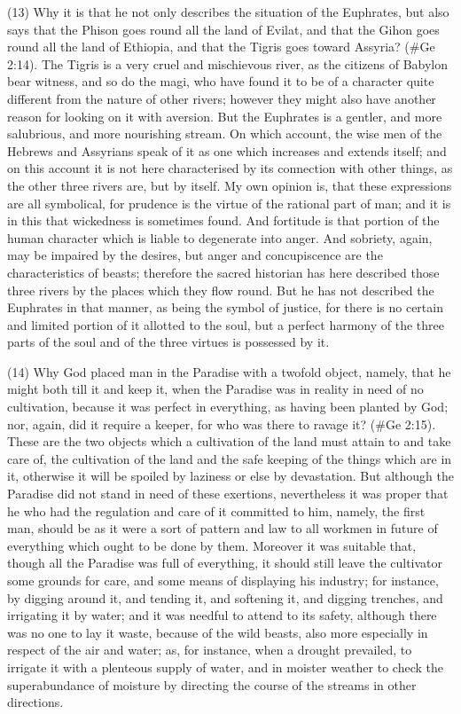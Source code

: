 (13) Why it is that he not only describes the situation of the Euphrates, but also says that the
Phison goes round all the land of Evilat, and that the Gihon goes round all the land of Ethiopia, and
that the Tigris goes toward Assyria? (\#Ge 2:14). The Tigris is a very cruel and mischievous
river, as the citizens of Babylon bear witness, and so do the magi, who have found it to be of a
character quite different from the nature of other rivers; however they might also have another
reason for looking on it with aversion. But the Euphrates is a gentler, and more salubrious, and
more nourishing stream. On which account, the wise men of the Hebrews and Assyrians speak of
it as one which increases and extends itself; and on this account it is not here characterised by its
connection with other things, as the other three rivers are, but by itself. My own opinion is, that
these expressions are all symbolical, for prudence is the virtue of the rational part of man; and it is
in this that wickedness is sometimes found. And fortitude is that portion of the human character
which is liable to degenerate into anger. And sobriety, again, may be impaired by the desires, but
anger and concupiscence are the characteristics of beasts; therefore the sacred historian has
here described those three rivers by the places which they flow round. But he has not described
the Euphrates in that manner, as being the symbol of justice, for there is no certain and limited
portion of it allotted to the soul, but a perfect harmony of the three parts of the soul and of the three
virtues is possessed by it.

(14) Why God placed man in the Paradise with a twofold object, namely, that he might both till it and
keep it, when the Paradise was in reality in need of no cultivation, because it was perfect in
everything, as having been planted by God; nor, again, did it require a keeper, for who was there to
ravage it? (\#Ge 2:15). These are the two objects which a cultivation of the land must attain to
and take care of, the cultivation of the land and the safe keeping of the things which are in it,
otherwise it will be spoiled by laziness or else by devastation. But although the Paradise did not
stand in need of these exertions, nevertheless it was proper that he who had the regulation and
care of it committed to him, namely, the first man, should be as it were a sort of pattern and law to
all workmen in future of everything which ought to be done by them. Moreover it was suitable that,
though all the Paradise was full of everything, it should still leave the cultivator some grounds for
care, and some means of displaying his industry; for instance, by digging around it, and tending it,
and softening it, and digging trenches, and irrigating it by water; and it was needful to attend to its
safety, although there was no one to lay it waste, because of the wild beasts, also more especially
in respect of the air and water; as, for instance, when a drought prevailed, to irrigate it with a
plenteous supply of water, and in moister weather to check the superabundance of moisture by
directing the course of the streams in other directions.

